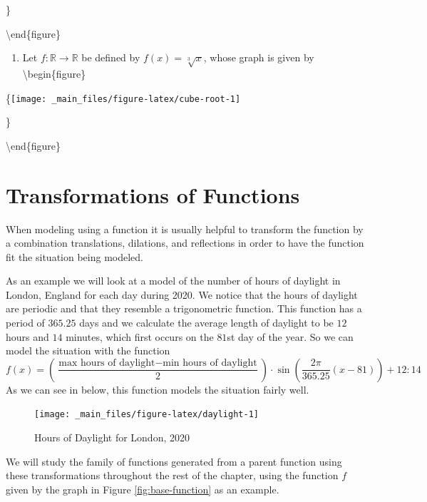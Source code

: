 \documentclass[
]{book}
\providecommand{\tightlist}{%
  \setlength{\itemsep}{0pt}\setlength{\parskip}{0pt}}
\let\stdsection\section
\renewcommand\section{\newpage\stdsection}
\theoremstyle{definition}
\theoremstyle{definition}
\theoremstyle{definition}
\theoremstyle{definition}
\theoremstyle{remark}
\begin{document}
\begin{enumerate}
  \}

  \textbackslash end\{figure\}

  \begin{enumerate}
  \def\labelenumii{\alph{enumii}.}
  \tightlist
  \item
    Let \(f:\mathbb{R} \rightarrow \mathbb{R}\) be defined by \(f(x)=\sqrt[3]{x}\), whose graph is given by
    \textbackslash begin\{figure\}
  \end{enumerate}

  \{\centering \texttt{[image: \_main\_files/figure-latex/cube-root-1]}

  \}

  \textbackslash end\{figure\}
\end{enumerate}

\hypertarget{transformations-of-functions}{%
\section{Transformations of Functions}\label{transformations-of-functions}}

When modeling using a function it is usually helpful to transform the function by a combination translations, dilations, and reflections in order to have the function fit the situation being modeled.

As an example we will look at a model of the number of hours of daylight in London, England for each day during 2020. We notice that the hours of daylight are periodic and that they resemble a trigonometric function. This function has a period of \(365.25\) days and we calculate the average length of daylight to be \(12\) hours and \(14\) minutes, which first occurs on the \(81\)st day of the year. So we can model the situation with the function \[f(x)= \left( \frac{\mbox{max hours of daylight} - \mbox{min hours of daylight}}{2}\right) \cdot \sin \left(\frac{2\pi}{365.25} \left(x-81\right)\right) + 12:14\]
As we can see in below, this function models the situation fairly well.

\begin{figure}

{\centering \texttt{[image: \_main\_files/figure-latex/daylight-1]} 

}

\caption{Hours of Daylight for London, 2020}\label{fig:daylight}
\end{figure}

We will study the family of functions generated from a parent function using these transformations throughout the rest of the chapter, using the function \(f\) given by the graph in Figure \ref{fig:base-function} as an example.
\end{document}
